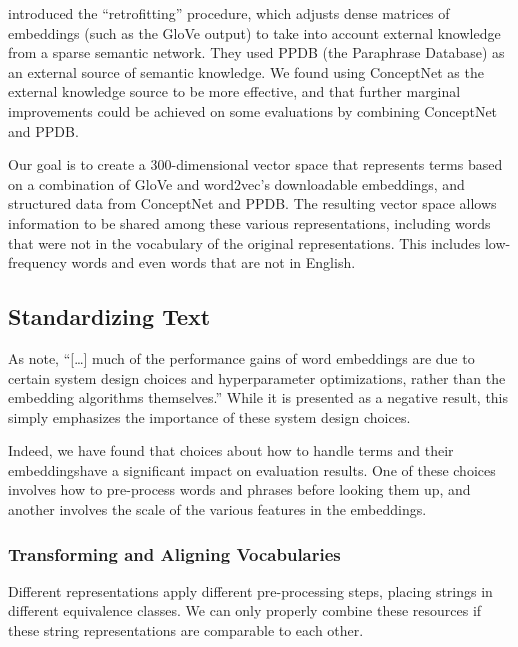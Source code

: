 \documentclass[11pt,letterpaper]{article}
\begin{document}
 introduced the ``retrofitting'' procedure,
which adjusts dense matrices of embeddings (such as the GloVe output) to take
into account external knowledge from a sparse semantic network. They used PPDB
\cite{ganitkevitch2013ppdb} (the Paraphrase Database) as an external source of
semantic knowledge. We found using ConceptNet as the external knowledge source
to be more effective, and that further marginal improvements could be achieved
on some evaluations by combining ConceptNet and PPDB.

Our goal is to create a 300-dimensional vector space that represents terms based
on a combination of GloVe and word2vec's downloadable embeddings, and structured
data from ConceptNet and PPDB. The resulting vector space allows information to
be shared among these various representations, including words that were not in
the vocabulary of the original representations. This includes low-frequency words
and even words that are not in English.

\subsection{Standardizing Text}

As  note,
``[\ldots] much of the performance gains of word embeddings are due to certain
system design choices and hyperparameter optimizations, rather than the
embedding algorithms themselves.'' While it is presented as a negative result,
this simply emphasizes the importance of these system design choices.

Indeed, we have found that choices about how to handle terms and their
embeddingshave a significant impact on evaluation results. One of these choices
involves how to pre-process words and phrases before looking them up, and
another involves the scale of the various features in the embeddings.


\subsubsection{Transforming and Aligning Vocabularies}

Different representations apply
different pre-processing steps, placing strings in different equivalence
classes. We can only properly combine these resources if these string
representations are comparable to each other.
\end{document}
